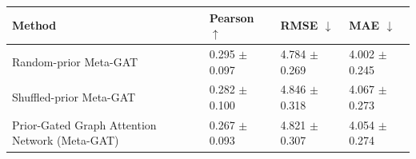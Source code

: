 \begin{tabular}{llll}
\toprule
Method & Pearson $\uparrow$ & RMSE $\downarrow$ & MAE $\downarrow$ \\
\midrule
Random-prior Meta-GAT & 0.295 $\pm$ 0.097 & 4.784 $\pm$ 0.269 & 4.002 $\pm$ 0.245 \\
Shuffled-prior Meta-GAT & 0.282 $\pm$ 0.100 & 4.846 $\pm$ 0.318 & 4.067 $\pm$ 0.273 \\
Prior-Gated Graph Attention Network (Meta-GAT) & 0.267 $\pm$ 0.093 & 4.821 $\pm$ 0.307 & 4.054 $\pm$ 0.274 \\
\bottomrule
\end{tabular}
